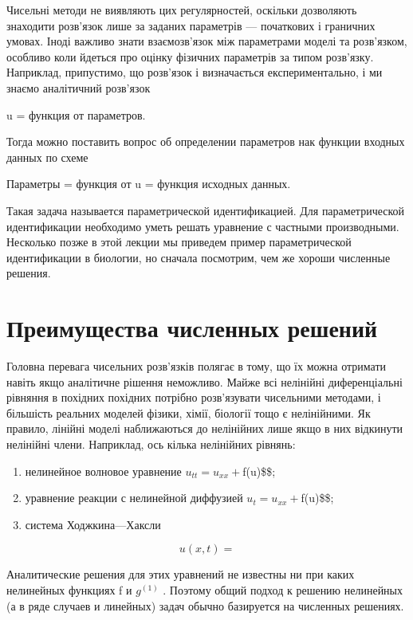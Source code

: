 \documentclass[
  ukrainian,
]{article}
\begin{document}
Чисельні методи не виявляють цих регулярностей, оскільки дозволяють
знаходити розв'язок лише за заданих параметрів --- початкових і
граничних умовах. Іноді важливо знати взаємозв'язок між параметрами
моделі та розв'язком, особливо коли йдеться про оцінку фізичних
параметрів за типом розв'язку. Наприклад, припустимо, що розв'язок і
визначається експериментально, і ми знаємо аналітичний розв'язок

u = функция от параметров.

Тогда можно поставить вопрос об определении параметров нак функции
входных данных по схеме

Параметры = функция от u = функция исходных данных.

Такая задача называется параметрической идентификацией. Для
параметрической идентификации необходимо уметь решать уравнение с
частными производными. Несколько позже в этой лекции мы приведем пример
параметрической идентификации в биологии, но сначала посмотрим, чем же
хороши численные решения.

\section{Преимущества численных
решений}\label{ux43fux440ux435ux438ux43cux443ux449ux435ux441ux442ux432ux430-ux447ux438ux441ux43bux435ux43dux43dux44bux445-ux440ux435ux448ux435ux43dux438ux439}

Головна перевага чисельних розв'язків полягає в тому, що їх можна
отримати навіть якщо аналітичне рішення неможливо. Майже всі нелінійні
диференціальні рівняння в похідних похідних потрібно розв'язувати
чисельними методами, і більшість реальних моделей фізики, хімії,
біології тощо є нелінійними. Як правило, лінійні моделі наближаються до
нелінійних лише якщо в них відкинути нелінійні члени. Наприклад, ось
кілька нелінійних рівнянь:

\begin{enumerate}
\def\labelenumi{\arabic{enumi})}
\item
  нелинейное волновое уравнение \(u_{tt} = u_{xx} +\)f(u)\$\$;
\item
  уравнение реакции с нелинейной диффузией \(u_t = u_{xx} +\)f(u)\$\$;
\item
  система Ходжкина---Хаксли
\end{enumerate}

\[
u(x, t) =
\]

Аналитические решения для этих уравнений не известны ни при каких
нелинейных функциях f и \(g^{(1)}\) . Поэтому общий подход к решению
нелинейных (а в ряде случаев и линейных) задач обычно базируется на
численных решениях.
\end{document}
